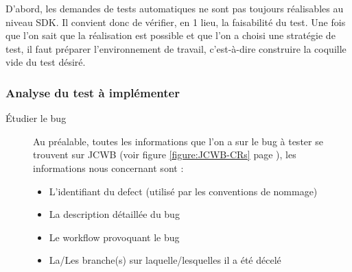 D'abord, les demandes de tests automatiques ne sont pas toujours r\'{e}alisables au niveau SDK. Il convient donc de v\'{e}rifier, en 1 lieu, la faisabilit\'{e} du test. Une fois que l'on sait que la r\'{e}alisation est possible et que l'on a choisi une strat\'{e}gie de test, il faut pr\'{e}parer l'environnement de travail, c'est-\`{a}-dire construire la coquille vide du test d\'{e}sir\'{e}.


\subsubsection{Analyse du test \`{a} impl\'{e}menter}
\begin{description}
	\item[\'{E}tudier le bug] Au pr\'{e}alable, toutes les informations que l'on a sur le bug \`{a} tester se trouvent sur JCWB (voir figure \ref{figure:JCWB-CRs} page \pageref{figure:JCWB-CRs}), les informations nous concernant sont :
\begin{itemize}
	\item L'identifiant du defect (utilisé par les conventions de nommage)
	\item La description détaillée du bug
	\item Le workflow provoquant le bug
	\item La/Les branche(s) sur laquelle/lesquelles il a été décelé
\end{itemize}


\end{description}
